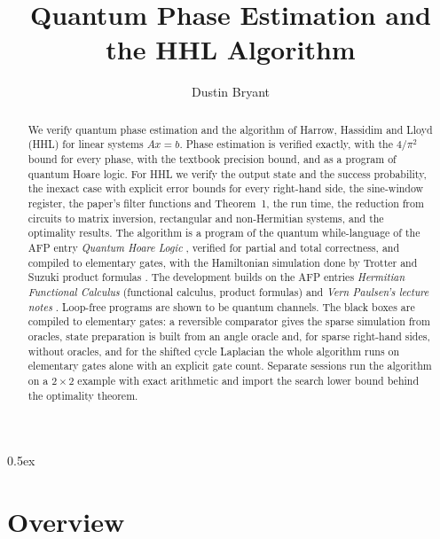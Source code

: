 \documentclass[11pt,a4paper]{article}
\theoremstyle{definition}
\begin{document}
\title{Quantum Phase Estimation and the HHL Algorithm}
\author{Dustin Bryant}
\maketitle

\begin{abstract}
We verify quantum phase estimation and the algorithm of Harrow, Hassidim and Lloyd (HHL)
\cite{hhl2009} for linear systems $Ax=b$.  Phase estimation is verified exactly, with the
$4/\pi^2$ bound for every phase, with the textbook precision bound, and as a program of quantum
Hoare logic.  For HHL we verify the output state and the success probability, the inexact case
with explicit error bounds for every right-hand side, the sine-window register, the paper's
filter functions and Theorem~1, the run time, the reduction from circuits to matrix inversion,
rectangular and non-Hermitian systems, and the optimality results.  The algorithm is a program of
the quantum while-language of the AFP entry \emph{Quantum Hoare Logic} \cite{liu2019afp}, verified
for partial and total correctness, and compiled to elementary gates, with the Hamiltonian
simulation done by Trotter and Suzuki product formulas \cite{berry2007}.  The development builds
on the AFP entries \emph{Hermitian Functional Calculus} (functional calculus, product formulas) and
\emph{Vern Paulsen's lecture notes} \cite{paulsen2011notes}.  Loop-free programs are shown to be
quantum channels.  The black boxes are compiled to elementary gates: a reversible comparator
gives the sparse simulation from oracles, state preparation is built from an angle oracle and,
for sparse right-hand sides, without oracles, and for the shifted cycle Laplacian the whole
algorithm runs on elementary gates alone with an explicit gate count.  Separate sessions run the
algorithm on a $2\times2$ example with exact arithmetic \cite{thiemann2014realimpl} and import
the search lower bound \cite{unruh2025co} behind the optimality theorem.
\end{abstract}

\tableofcontents
\newpage

\parindent 0pt\parskip 0.5ex

\section*{Overview}
\end{document}
